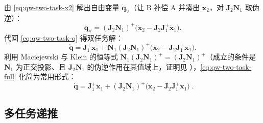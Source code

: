 由 \cref{eq:qw-two-task-x2} 解出自由变量 $\dot{\boldsymbol{q}}_{\forall}$（让 B 补偿 A 并凑出 $\dot{\boldsymbol{x}}_2$，对 $\boldsymbol{J}_2\boldsymbol{N}_1$ 取伪逆）\cite{yu2021quadruped}：
\begin{equation}
  \dot{\boldsymbol{q}}_{\forall}=(\boldsymbol{J}_2\boldsymbol{N}_1)^+\big(\dot{\boldsymbol{x}}_2-\boldsymbol{J}_2\boldsymbol{J}_1^+\dot{\boldsymbol{x}}_1\big).
  \label{eq:qw-two-task-qfree}
\end{equation}
代回 \cref{eq:qw-two-task-q} 得双任务解：
\begin{equation}
  \dot{\boldsymbol{q}}=\boldsymbol{J}_1^+\dot{\boldsymbol{x}}_1+\boldsymbol{N}_1(\boldsymbol{J}_2\boldsymbol{N}_1)^+\big(\dot{\boldsymbol{x}}_2-\boldsymbol{J}_2\boldsymbol{J}_1^+\dot{\boldsymbol{x}}_1\big).
  \label{eq:qw-two-task-full}
\end{equation}
利用 Maciejewski 与 Klein 的恒等式 $\boldsymbol{N}_1(\boldsymbol{J}_2\boldsymbol{N}_1)^+=(\boldsymbol{J}_2\boldsymbol{N}_1)^+$（成立的条件是 $\boldsymbol{N}_1$ 为正交投影、且 $\boldsymbol{J}_2\boldsymbol{N}_1$ 的伪逆作用在其值域上，证明见 \cite{maciejewski1985obstacle}），\cref{eq:qw-two-task-full} 化简为常用形式\cite{yu2021quadruped,maciejewski1985obstacle}：
\begin{equation}
  \boxed{\;\dot{\boldsymbol{q}}=\boldsymbol{J}_1^+\dot{\boldsymbol{x}}_1+(\boldsymbol{J}_2\boldsymbol{N}_1)^+\big(\dot{\boldsymbol{x}}_2-\boldsymbol{J}_2\boldsymbol{J}_1^+\dot{\boldsymbol{x}}_1\big)\;}.
  \label{eq:qw-two-task-simp}
\end{equation}

\subsection{多任务递推}
\label{subsec:qw-multi-task}

